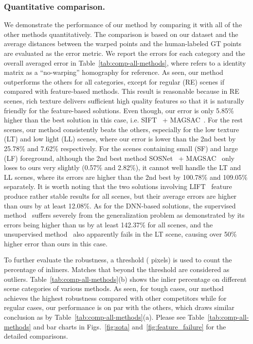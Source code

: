\documentclass[runningheads]{llncs}
\begin{document}
\subsubsection{Quantitative comparison.}


We demonstrate the performance of our method by comparing it with all of the other methods quantitatively. The comparison is based on our dataset and the average  distances between the warped points and the human-labeled GT points are evaluated as the error metric. We report the errors for each category and the overall averaged error in Table~\ref{tab:comp-all-methods}, where  refers to a  identity matrix as a ``no-warping'' homography for reference. As seen, our method outperforms the others for all categories, except for regular (RE) scenes if compared with feature-based methods. This result is reasonable because in RE scenes, rich texture delivers sufficient high quality features so that it is naturally friendly for the feature-based solutions. Even though, our error is only 5.85\% higher than the best solution in this case, i.e. SIFT~\cite{lowe2004distinctive} + MAGSAC~\cite{barath2019magsac}. For the rest scenes, our method consistently beats the others, especially for the low texture (LT) and low light (LL) scenes, where our error is lower than the 2nd best by 25.78\% and 7.62\% respectively. For the scenes containing small (SF) and large (LF) foreground, although the 2nd best method SOSNet~\cite{tian2019sosnet} + MAGSAC~\cite{barath2019magsac} only loses to ours very slightly (0.57\% and 2.82\%), it cannot well handle the LT and LL scenes, where its errors are higher than the 2nd best by 100.78\% and 109.05\% separately.
It is worth noting that the two solutions involving LIFT~\cite{yi2016lift} feature produce rather stable results for all scenes, but their average errors are higher than ours by at least 12.08\%. As for the DNN-based solutions, the supervised method~\cite{detone2016deep} suffers severely from the generalization problem as demonstrated by its errors being higher than us by at least 142.37\% for all scenes, and the unsupervised method~\cite{nguyen2018unsupervised} also apparently fails in the LT scene, causing over 50\% higher error than ours in this case.

To further evaluate the robustness, a threshold ( pixels) is used to count the percentage of inliners.  Matches that beyond the threshold are considered as outliers. Table~\ref{tab:comp-all-methods}(b) shows the inlier percentage on different scene categories of various methods. As seen, for tough cases, our method achieves the highest robustness compared with other competitors while for regular cases, our performance is on par with the others, which draws similar conclusion as by Table~\ref{tab:comp-all-methods}(a).
Please see Table~\ref{tab:comp-all-methods} and bar charts in Figs.~\ref{fig:sota} and~\ref{fig:feature_failure} for the detailed comparisons.
\end{document}
